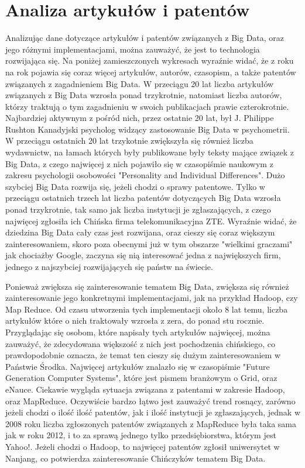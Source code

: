 \documentclass[twocolumn]{svjour3}          %
\begin{document}
\section{Analiza artykułów i patentów}
\label{sub:analiza_artykulow}
Analizując dane dotyczące artykułów i patentów związanych z Big Data, oraz jego różnymi implementacjami, można zauważyć, że jest to technologia rozwijająca się. Na poniżej zamieszczonych wykresach wyraźnie widać, że z roku na rok pojawia się coraz więcej artykułów, autorów, czasopism, a także patentów związanych z zagadnieniem Big Data. W przeciągu 20 lat liczba artykułów związanych z Big Data wzrosła ponad trzykrotnie, natomiast liczba autorów, którzy traktują o tym zagadnieniu w swoich publikacjach prawie czterokrotnie. Najbardziej aktywnym z pośród nich, przez ostatnie 20 lat, był J. Philippe Rushton Kanadyjski psycholog widzący zastosowanie Big Data w psychometrii. W przeciągu ostatnich 20 lat trzykotnie zwiększyła się również liczba wydawnictw, na łamach których były publikowane były teksty mające związek z Big Data, z czego najwięcej z nich pojawiło się w czasopiśmie naukowym z zakresu psychologii osobowości "Personality and Individual Differences". Dużo szybciej Big Data rozwija się, jeżeli chodzi o sprawy patentowe. Tylko w przeciągu ostatnich trzech lat liczba patentów dotyczących Big Data wzrosła ponad trzykrotnie, tak samo jak liczba instytucji je zgłaszających, z czego najwięcej zgłosiła ich Chińska firma telekomunikacyjna ZTE. Wyraźnie widać, że dziedzina Big Data cały czas jest rozwijana, oraz cieszy się coraz większym zainteresowaniem, skoro poza obecnymi już w tym obszarze "wielkimi graczami" jak chociażby Google, zaczyna się nią interesować jedna z największych firm, jednego z najszybciej rozwijających się państw na świecie.

Ponieważ zwiększa się zainteresowanie tematem Big Data, zwiększa się również zainteresowanie jego konkretnymi implementacjami, jak na przykład Hadoop, czy Map Reduce. Od czasu utworzenia tych implementacji około 8 lat temu, liczba artykułów które o nich traktowały wzrosła z zera, do ponad stu rocznie. Przyglądając się osobom, które napisały tych artykułów najwięcej, można zauważyć, że zdecydowana większość z nich jest pochodzenia chińskiego, co prawdopodobnie oznacza, że temat ten cieszy się dużym zainteresowaniem w Państwie Środka. Najwięcej artykułów znalazło się w czasopiśmie "Future Generation Computer Systems", które jest pismem branżowym o Grid, oraz eNauce. Ciekawie wygląda sytuacja związana z patentami w zakresie Hadoop, oraz MapReduce. Oczywiście bardzo łątwo jest zauważyć trend rosnący, zarówno jeżeli chodzi o ilość ilość patentów, jak i ilość instytucji je zgłaszających, jednak w 2008 roku liczba zgłoszonych patentów związanych z MapReduce była taka sama jak w roku 2012, i to za sprawą jednego tylko przedsiębiorstwa, którym jest Yahoo!. Jeżeli chodzi o Hadoop, to najwięcej patentów zgłosił uniwersytet w Nanjang, co potwierdza zainteresowanie Chińczyków tematem Big Data.
\end{document}
